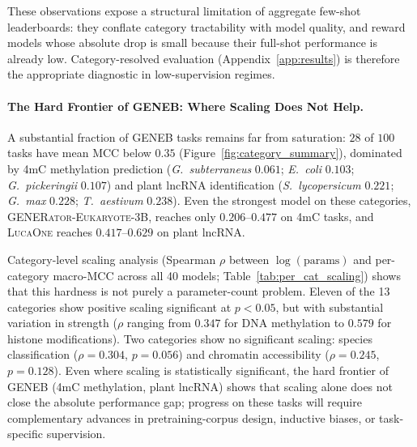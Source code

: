 \documentclass{article}
\theoremstyle{plain}
\theoremstyle{definition}
\theoremstyle{remark}
\begin{document}
These observations expose a structural limitation of aggregate
few-shot leaderboards: they conflate category tractability with
model quality, and reward models whose absolute drop is small
because their full-shot performance is already low. Category-resolved
evaluation (Appendix~\ref{app:results}) is therefore the
appropriate diagnostic in low-supervision regimes.

\paragraph{The Hard Frontier of GENEB: Where Scaling Does Not Help.}
A substantial fraction of GENEB tasks remains far from saturation:
$28$ of $100$ tasks have mean MCC below $0.35$
(Figure~\ref{fig:category_summary}), dominated by 4mC methylation
prediction (\emph{G.\ subterraneus} $0.061$;
\emph{E.\ coli} $0.103$; \emph{G.\ pickeringii} $0.107$) and plant
lncRNA identification (\emph{S.\ lycopersicum} $0.221$;
\emph{G.\ max} $0.228$; \emph{T.\ aestivum} $0.238$). Even the
strongest model on these categories,
\textsc{GENERator-Eukaryote-3B}, reaches only $0.206$--$0.477$ on 4mC
tasks, and \textsc{LucaOne} reaches $0.417$--$0.629$ on plant lncRNA.

Category-level scaling analysis (Spearman $\rho$ between
$\log(\text{params})$ and per-category macro-MCC across all 40
models; Table~\ref{tab:per_cat_scaling}) shows that this hardness
is not purely a parameter-count problem. Eleven of the 13
categories show positive scaling significant at $p<0.05$, but with
substantial variation in strength ($\rho$ ranging from $0.347$ for
DNA methylation to $0.579$ for histone modifications). Two
categories show no significant scaling: species classification
($\rho=0.304$, $p=0.056$) and chromatin accessibility ($\rho=0.245$,
$p=0.128$). Even where scaling is statistically significant, the
hard frontier of GENEB (4mC methylation, plant lncRNA) shows that
scaling alone does not close the absolute performance gap; progress
on these tasks will require complementary advances in
pretraining-corpus design, inductive biases, or task-specific
supervision.
\end{document}
